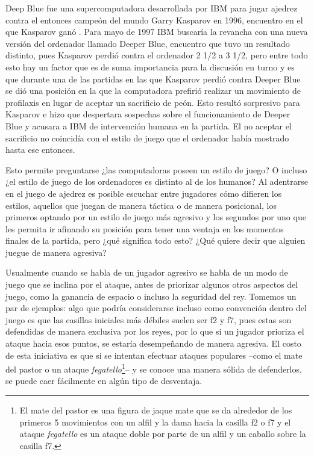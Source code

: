\documentclass[twoside,openright,12pt,a4paper,spanish]{book}
\begin{document}
Deep Blue fue una supercomputadora desarrollada por IBM para jugar ajedrez contra el entonces campeón del mundo Garry Kasparov en 1996, encuentro en el que Kasparov ganó \cite[p. 59]{campbell2002deep}. Para mayo de 1997 IBM buscaría la revancha con una nueva versión del ordenador llamado Deeper Blue, encuentro que tuvo un resultado distinto, pues Kasparov perdió contra el ordenador 2 1/2 a 3 1/2, pero entre todo esto hay un factor que es de suma importancia para la discusión en turno y es que durante una de las partidas en las que Kasparov perdió contra Deeper Blue se dió una posición en la que la computadora prefirió realizar un movimiento de profilaxis en lugar de aceptar un sacrificio de peón. Esto resultó sorpresivo para Kasparov e hizo que despertara sospechas sobre el funcionamiento de Deeper Blue y acusara a IBM de intervención humana en la partida. El no aceptar el sacrificio no coincidía con el estilo de juego que el ordenador había mostrado hasta ese entonces.

Esto permite preguntarse ¿las computadoras poseen un estilo de juego? O incluso ¿el estilo de juego de los ordenadores es distinto al de los humanos? Al adentrarse en el juego de ajedrez es posible escuchar entre jugadores cómo difieren los estilos, aquellos que juegan de manera táctica o de manera posicional, los primeros optando por un estilo de juego más agresivo y los segundos por uno que les permita ir afinando su posición para tener una ventaja en los momentos finales de la partida, pero ¿qué significa todo esto? ¿Qué quiere decir que alguien juegue de manera agresiva?

Usualmente cuando se habla de un jugador agresivo se habla de un modo de juego que se inclina por el ataque, antes de priorizar algunos otros aspectos del juego, como la ganancia de espacio o incluso la seguridad del rey. Tomemos un par de ejemplos: algo que podr\'ia considerarse incluso como convenci\'on dentro del juego es que las casillas iniciales m\'as d\'ebiles suelen ser f2 y f7, pues estas son defendidas de manera exclusiva por los reyes, por lo que si un jugador prioriza el ataque hacia esos puntos, se estar\'ia desempe\~nando de manera agresiva. El costo de esta iniciativa es que si se intentan efectuar ataques populares --como el mate del pastor o un ataque \emph{fegatello}\footnote{El mate del pastor es una figura de jaque mate que se da alrededor de los primeros 5 movimientos con un alfil y la dama hacia la casilla f2 o f7 y el ataque \emph{fegatello} es un ataque doble por parte de un alfil y un caballo sobre la casilla f7.}-- y se conoce una manera sólida de defenderlos, se puede caer f\'acilmente en alg\'un tipo de desventaja.
\end{document}
